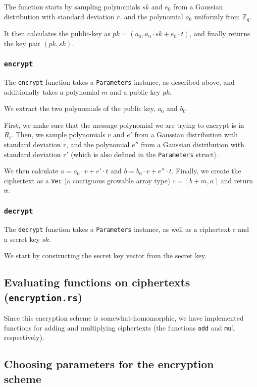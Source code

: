 \documentclass{article}
\begin{document}
The function starts by sampling polynomials $sk$ and $e_0$ from a Gaussian distribution with standard deviation $r$, and the polynomial $a_0$ uniformly from $\mathbb{Z}_q$.

It then calculates the public-key as $pk = (a_0, a_0 \cdot sk + e_0 \cdot t)$, and finally returns the key pair $(pk, sk)$.

\subsubsection{\lstinline{encrypt}}

The \lstinline{encrypt} function takes a \lstinline{Parameters} instance, as described above, and additionally takes a polynomial $m$ and a public key $pk$.

We extract the two polynomials of the public key, $a_0$ and $b_0$.

First, we make sure that the message polynomial we are trying to encrypt is in $R_t$.
Then, we sample polynomials $v$ and $e'$ from a Gaussian distribution with standard deviation $r$, and the polynomial $e''$ from a Gaussian distribution with standard deviation $r'$ (which is also defined in the \lstinline{Parameters} struct).

We then calculate $a = a_0 \cdot v + e' \cdot t$ and $b = b_0 \cdot v + e'' \cdot t$.
Finally, we create the ciphertext as a \lstinline{Vec} (a contiguous growable array type) $c = [b + m, a]$ and return it.

\subsubsection{\lstinline{decrypt}}

The \lstinline{decrypt} function takes a \lstinline{Parameters} instance, as well as a ciphertext $c$ and a secret key $sk$.

We start by constructing the secret key vector from the secret key.

\subsection{Evaluating functions on ciphertexts (\lstinline{encryption.rs})}

Since this encryption scheme is somewhat-homomorphic, we have implemented functions for adding and multiplying ciphertexts (the functions \lstinline{add} and \lstinline{mul} respectively).

\subsection{Choosing parameters for the encryption scheme}
\end{document}

